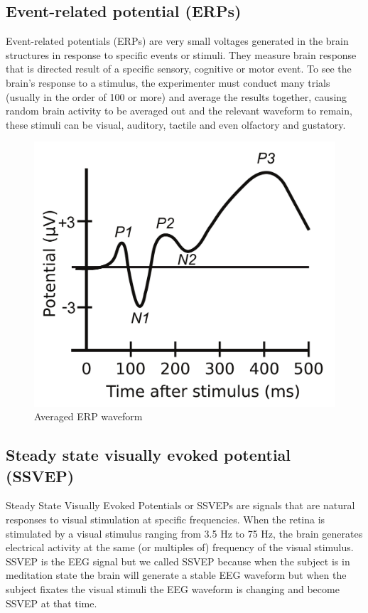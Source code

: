 \subsection{Event-related potential (ERPs)}

\hspace{1.5cm} Event-related potentials (ERPs) are very small voltages generated in the brain structures in response to specific events or stimuli. They measure brain response that is directed result of a specific sensory, cognitive or motor event. To see the brain's response to a stimulus, the experimenter must conduct many trials (usually in the order of 100 or more) and average the results together, causing random brain activity to be averaged out and the relevant waveform to remain, these stimuli can be visual, auditory, tactile and even olfactory and gustatory.


\begin{figure}[h]
	\centering
	\includegraphics[scale = 0.3]{chapter3/32.pdf}
	\caption{Averaged ERP waveform}
\end{figure}

\newpage
\subsection{Steady state visually evoked potential (SSVEP)}

\hspace{1.5cm} Steady State Visually Evoked Potentials or SSVEPs are signals that are natural responses to visual stimulation at specific frequencies. When the retina is stimulated by a visual stimulus ranging from 3.5 Hz to 75 Hz, the brain generates electrical activity at the same (or multiples of) frequency of the visual stimulus. SSVEP is the EEG signal but we called SSVEP because when the subject is in meditation state the brain will generate a stable EEG waveform but when the subject fixates the visual stimuli the EEG waveform is changing and become SSVEP at that time.\par


